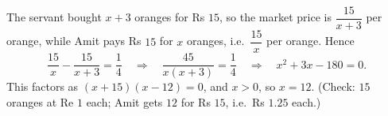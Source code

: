 The servant bought $x+3$ oranges for Rs $15$, so the market price is $\dfrac{15}{x+3}$ per orange, while Amit pays Rs $15$ for $x$ oranges, i.e.\ $\dfrac{15}{x}$ per orange. Hence
\[
\dfrac{15}{x}-\dfrac{15}{x+3}=\dfrac{1}{4}\quad\Longrightarrow\quad\dfrac{45}{x(x+3)}=\dfrac{1}{4}\quad\Longrightarrow\quad x^2+3x-180=0 .
\]
This factors as $(x+15)(x-12)=0$, and $x>0$, so $x=\boxed{12}$. (Check: $15$ oranges at Re $1$ each; Amit gets $12$ for Rs $15$, i.e.\ Rs $1.25$ each.)
